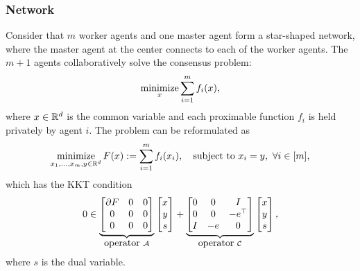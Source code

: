 \subsubsection{Network}\label{sec:network}
Consider that $m$ worker agents and one master agent form a star-shaped network, where the master agent at the center connects to each of the worker agents. The $m+1$ agents collaboratively solve the consensus problem:  $$\operatorname*{minimize}_{x} \sum_{i=1}^m f_i(x),$$ where $x\in \mathbb{R}^d$ is the common variable and each proximable function $f_i$ is held privately by agent $i$. The problem can be reformulated as
\begin{align}
\Min_{x_1,\dots,x_m,y\in \RR^d} F(x) := \sum_{i=1}^mf_i(x_i),\quad \St~ x_i=y, ~\forall i \in [m],
\end{align}
{which has the  KKT condition}
\begin{equation}\label{pro:decentral}
0\in\underbrace{
\begin{bmatrix}
\partial F&0&0\\
0&0&0 \\
0&0&0
\end{bmatrix}}_{\mbox{operator}~\cA}\begin{bmatrix}
x\\
y\\
s
\end{bmatrix}+\underbrace{\begin{bmatrix}
0 & 0&I\\
0 & 0 & -e^\top \\
I & -e & 0
\end{bmatrix}}_{\mbox{operator}~\cC}\begin{bmatrix}
x\\
y\\
s
\end{bmatrix},
\end{equation}
where $s$ is the dual variable.

